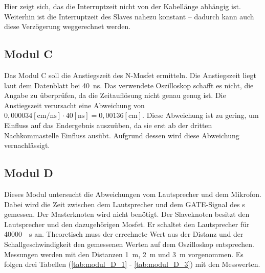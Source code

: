 Hier zeigt sich, das die Interruptzeit nicht von der Kabellänge abhängig ist. Weiterhin ist die Interruptzeit des Slaves nahezu konstant -- dadurch kann auch diese Verzögerung weggerechnet werden. 

\subsection{Modul C}
Das Modul C soll die Anstiegszeit des N-Mosfet ermitteln. Die Anstiegszeit liegt laut dem Datenblatt bei \SI{40}{\nano\s}. Das verwendete Oszilloskop schafft es nicht, die Angabe zu überprüfen, da die Zeitauflösung nicht genau genug ist. Die Anstiegszeit verursacht eine Abweichung von $\si{0,000034}[\si{\centi\m\per\nano\s}] \cdot \si{40} [\si{\nano\s}] = \si{0,00136} [\si{\centi\m}]$. Diese Abweichung ist zu gering, um Einfluss auf das Endergebnis auszuüben, da sie erst ab der dritten Nachkommastelle Einfluss ausübt. Aufgrund dessen wird diese Abweichung vernachlässigt.

\subsection{Modul D}
\label{sec:modul_D}
Dieses Modul untersucht die Abweichungen vom Lautsprecher und dem Mikrofon. Dabei wird die Zeit zwischen dem Lautsprecher und dem \si{GATE}-Signal des \microphone s \platz gemessen. Der Masterknoten wird nicht benötigt. Der Slaveknoten besitzt den Lautsprecher und den dazugehörigen Mosfet. Er schaltet den Lautsprecher für \SI{40000}{\mu\s} an. Theoretisch muss der errechnete Wert aus der Distanz und der Schallgeschwindigkeit den gemessenen Werten auf dem Oszilloskop entsprechen. Messungen werden mit den Distanzen \SI{1}{m}, \SI{2}{m} und \SI{3}{m} vorgenommen. Es folgen drei Tabellen (\ref{tab:modul_D_1} - \ref{tab:modul_D_3}) mit den Messwerten. 

